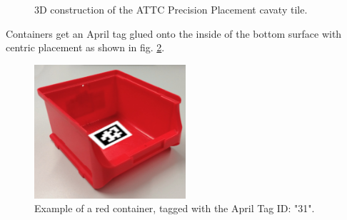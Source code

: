 {\begin{figure}[h!]
	\centering
	\hspace{0.05\textwidth}
	\caption{3D construction  of the ATTC Precision Placement cavaty tile.}%
	\label{fig:cubeObjectTile}
\end{figure}

Containers get an April tag glued onto the inside of the bottom surface with centric placement as shown in fig. \ref{fig:redContainerTagged}.

\begin{figure}[h!]
	\centering
	\includegraphics[width= 0.5\textwidth ]{./images/AprilTags/container_redTAG.png}
	\caption{Example of a red container, tagged with the April Tag ID: "31".}
	\label{fig:redContainerTagged}
\end{figure}


}
